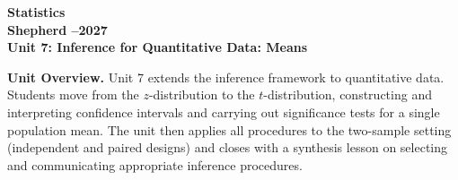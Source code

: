 \documentclass[10pt]{article}
\begin{document}
\vspace{-1.3in}

\begin{center}
  {\color{white}\bfseries\fontsize{24}{30}\selectfont Statistics}\\[5pt]
  {\color{goldacc}\bfseries\large Shepherd --2027}\\[10pt]
  {\color{white}\bfseries\Large Unit 7: Inference for Quantitative Data: Means}\\[3pt]
\end{center}

\vspace{0.18in}

\begin{tcolorbox}[colback=sky,colframe=navy,boxrule=0.9pt,arc=2mm,
    left=4mm,right=4mm,top=2mm,bottom=2mm]
  \small\textbf{Unit Overview.}\quad
  Unit 7 extends the inference framework to quantitative data. Students move from the
  $z$-distribution to the $t$-distribution, constructing and interpreting confidence
  intervals and carrying out significance tests for a single population mean. The unit
  then applies all procedures to the two-sample setting (independent and paired designs)
  and closes with a synthesis lesson on selecting and communicating appropriate inference
  procedures.
\end{tcolorbox}

\vspace{0.14in}
\end{document}
